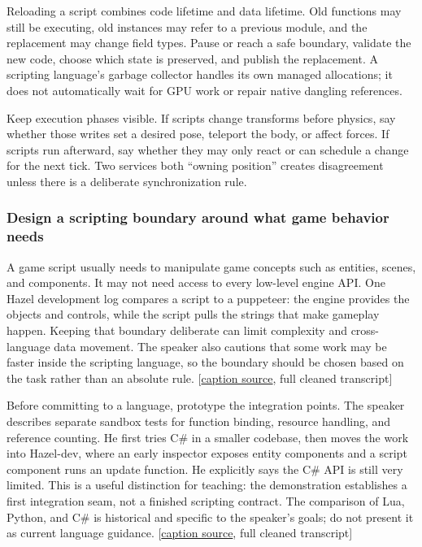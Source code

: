Reloading a script combines code lifetime and data lifetime. Old functions may still be executing, old instances may refer to a previous module, and the replacement may change field types. Pause or reach a safe boundary, validate the new code, choose which state is preserved, and publish the replacement. A scripting language's garbage collector handles its own managed allocations; it does not automatically wait for GPU work or repair native dangling references.

Keep execution phases visible. If scripts change transforms before physics, say whether those writes set a desired pose, teleport the body, or affect forces. If scripts run afterward, say whether they may only react or can schedule a change for the next tick. Two services both ``owning position'' creates disagreement unless there is a deliberate synchronization rule.

\subsubsection{Design a scripting boundary around what game behavior needs}\label{06-engine-ii-ch040-design-a-scripting-boundary-around-what-game-behavior-needs}

\hypertarget{06-engine-ii-ch040-design-a-scripting-boundary-around-what-game-behavior-needs}{}

A game script usually needs to manipulate game concepts such as entities, scenes, and components. It may not need access to every low-level engine API. One Hazel development log compares a script to a puppeteer: the engine provides the objects and controls, while the script pulls the strings that make gameplay happen. Keeping that boundary deliberate can limit complexity and cross-language data movement. The speaker also cautions that some work may be faster inside the scripting language, so the boundary should be chosen based on the task rather than an absolute rule. {[}\href{https://www.youtube.com/watch?v=ilqJfU3bUtM}{caption source}, full cleaned transcript{]}

Before committing to a language, prototype the integration points. The speaker describes separate sandbox tests for function binding, resource handling, and reference counting. He first tries C\# in a smaller codebase, then moves the work into Hazel-dev, where an early inspector exposes entity components and a script component runs an update function. He explicitly says the C\# API is still very limited. This is a useful distinction for teaching: the demonstration establishes a first integration seam, not a finished scripting contract. The comparison of Lua, Python, and C\# is historical and specific to the speaker's goals; do not present it as current language guidance. {[}\href{https://www.youtube.com/watch?v=ilqJfU3bUtM}{caption source}, full cleaned transcript{]}

